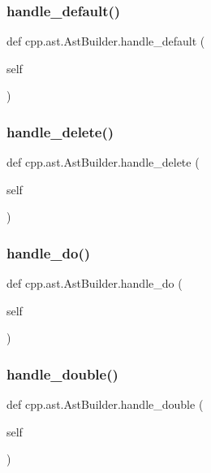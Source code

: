 \subsubsection{\texorpdfstring{handle\_default()}{handle\_default()}}
{\footnotesize\ttfamily def cpp.\+ast.\+Ast\+Builder.\+handle\+\_\+default (\begin{DoxyParamCaption}\item[{}]{self }\end{DoxyParamCaption})}

\mbox{\label{classcpp_1_1ast_1_1_ast_builder_aa5b7a781afe524bebdf42bdeb4766507}} 
\subsubsection{\texorpdfstring{handle\_delete()}{handle\_delete()}}
{\footnotesize\ttfamily def cpp.\+ast.\+Ast\+Builder.\+handle\+\_\+delete (\begin{DoxyParamCaption}\item[{}]{self }\end{DoxyParamCaption})}

\mbox{\label{classcpp_1_1ast_1_1_ast_builder_a540226b483513b423d4ec2c4f10b18f5}} 
\subsubsection{\texorpdfstring{handle\_do()}{handle\_do()}}
{\footnotesize\ttfamily def cpp.\+ast.\+Ast\+Builder.\+handle\+\_\+do (\begin{DoxyParamCaption}\item[{}]{self }\end{DoxyParamCaption})}

\mbox{\label{classcpp_1_1ast_1_1_ast_builder_ad1bd68af800dafcafdfa56e474f9d642}} 
\subsubsection{\texorpdfstring{handle\_double()}{handle\_double()}}
{\footnotesize\ttfamily def cpp.\+ast.\+Ast\+Builder.\+handle\+\_\+double (\begin{DoxyParamCaption}\item[{}]{self }\end{DoxyParamCaption})}

